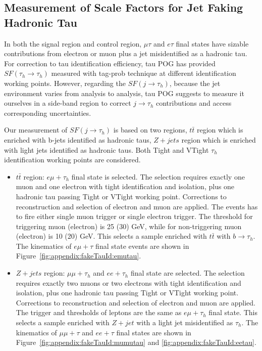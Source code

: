 \FloatBarrier




\subsection{Measurement of Scale Factors for Jet Faking Hadronic Tau}
\label{sec:analysis:calibration:jetToTauh}


In both the signal region and control region, $\mu \tau$ and $e \tau$ final states have sizable contributions from electron or muon plus a jet misidentified as a hadronic tau.  For correction to tau identification efficiency, tau POG has provided $SF (\tau_h \to \tau_h)$ measured with tag-prob technique at different identification working points.  However, regarding the $SF (j \to \tau_h)$, because the jet environment varies from analysis to analysis, tau POG suggests to measure it ourselves in a side-band region to correct $j \to \tau_h$ contributions and access corresponding uncertainties.

Our measurement of $SF (j\to \tau_h)$ is based on two regions, $t\bar{t}$ region which is enriched with b-jets identified as hadronic taus, $Z+jets$ region which is enriched with light jets identified as hadronic taus. Both Tight and VTight $\tau_h$ identification working points are considered.

\begin{itemize}
    \item $t\bar{t}$ region: $e\mu+\tau_h$ final state is selected. The selection requires exactly one muon and one electron with tight identification and isolation, plus one hadronic tau passing Tight or VTight working point. Corrections to reconstruction and selection of electron and muon are applied. The events has to fire either single muon trigger or single electron trigger.  The \pt threshold for triggering muon (electron) is 25 (30) GeV, while for non-triggering muon (electron) is 10 (20) GeV.  This selects a sample enriched with $t\bar{t}$ with $b \to \tau_h$. The kinematics of $e\mu+\tau$ final state events are shown in Figure~\ref{fig:appendix:fakeTauId:emutau}.
    
    
    \item $Z+jets$ region: $\mu\mu+\tau_h$ and $ee+\tau_h$ final state are selected.  The selection requires exactly two muons or two electrons with tight identification and isolation, plus one hadronic tau passing Tight or VTight working point.  Corrections to reconstruction and selection of electron and muon are applied. The trigger and \pt thresholds of leptons are the same as $e\mu+\tau_h$ final state.  This selects a sample enriched with $Z + jet$ with a light jet misidentified as $\tau_h$. The kinematics of $\mu\mu+\tau$ and $ee+\tau$ final states are shown in Figure~\ref{fig:appendix:fakeTauId:mumutau} and \ref{fig:appendix:fakeTauId:eetau}.
\end{itemize}

